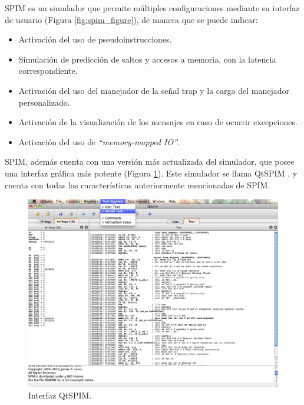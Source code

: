 SPIM es un simulador que permite múltiples configuraciones mediante su interfaz de usuario (Figura \ref{fig:spim_figure}), de manera que se puede indicar:

\begin{itemize}

\item Activación del uso de pseudoinstrucciones.

\item Simulación de predicción de saltos y accesos a memoria, con la latencia correspondiente.

\item Activación del uso del manejador de la señal trap y la carga del manejador personalizado.

\item Activación de la visualización de los mensajes en caso de ocurrir excepciones.

\item Activación del uso de \emph{``memory-mapped IO''}.

\end{itemize}

SPIM, además cuenta con una versión más actualizada del simulador, que posee una interfaz gráfica más potente (Figura \ref{fig:qtspim_figure}). Este simulador se llama QtSPIM \cite{aguilar2013simuladores}, y cuenta con todas las características anteriormente mencionadas de SPIM.

\begin{figure}[htbp]
 	\centering
 	\includegraphics[width=12cm]{figures/qtspim_figure}
 	\caption{Interfaz QtSPIM.}
	\label{fig:qtspim_figure}
\end{figure}

